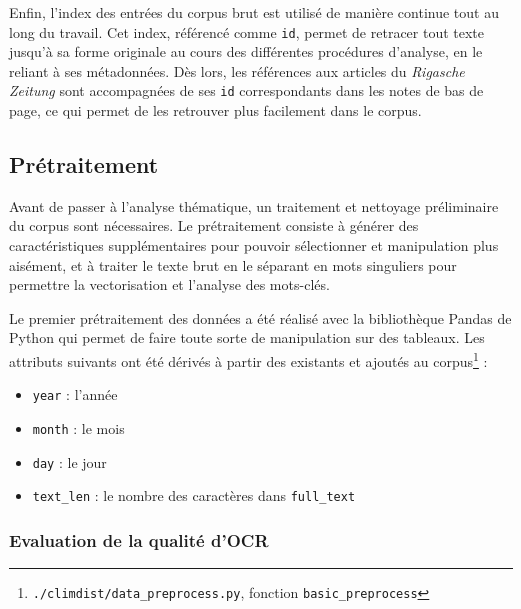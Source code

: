 \documentclass[a4paper,twoside,12pt]{article}
\begin{document}
Enfin, l'index des entrées du corpus brut est utilisé de manière continue tout au long du travail. Cet index, référencé comme \texttt{id}, permet de retracer tout texte jusqu'à sa forme originale au cours des différentes procédures d'analyse, en le reliant à ses métadonnées. Dès lors, les références aux articles du \textit{Rigasche Zeitung} sont accompagnées de ses \texttt{id} correspondants dans les notes de bas de page, ce qui permet de les retrouver plus facilement dans le corpus.\label{id_indexing}

\subsection{Prétraitement}  \label{pretraitement}

Avant de passer à l'analyse thématique, un traitement et nettoyage préliminaire du corpus sont nécessaires. Le prétraitement consiste à générer des caractéristiques supplémentaires pour pouvoir sélectionner et manipulation plus aisément, et à traiter le texte brut en le séparant en mots singuliers pour permettre la vectorisation et l'analyse des mots-clés.

Le premier prétraitement des données a été réalisé avec la bibliothèque Pandas de Python qui permet de faire toute sorte de manipulation sur des tableaux. Les attributs suivants ont été dérivés à partir des existants et ajoutés au corpus\footnote{{\texttt{./climdist/data\_preprocess.py}, fonction \texttt{basic\_preprocess}}} :

\vspace{1ex}
\begin{itemize}[label=$\bullet$]
    \item \texttt{year} : l'année
    \item \texttt{month} : le mois
    \item \texttt{day} : le jour
    \item \texttt{text\_len} : le nombre des caractères dans \texttt{full\_text}
\end{itemize}
\vspace{2ex}

\subsubsection{Evaluation de la qualité d'OCR} \label{ocr_quality}
\end{document}
